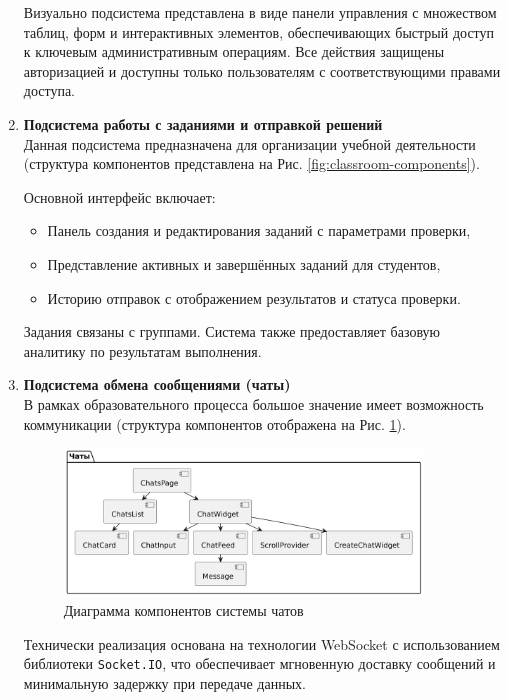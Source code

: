 \begin{enumerate}
  Визуально подсистема представлена в виде панели управления с множеством таблиц, форм и интерактивных элементов, обеспечивающих быстрый доступ к ключевым административным операциям. Все действия защищены авторизацией и доступны только пользователям с соответствующими правами доступа.

  \item \textbf{Подсистема работы с заданиями и отправкой решений}\\
  Данная подсистема предназначена для организации учебной деятельности (структура компонентов представлена на Рис. \ref{fig:classroom-components}). 
  
  Основной интерфейс включает:
  \begin{itemize}
    \item Панель создания и редактирования заданий с параметрами проверки,
    \item Представление активных и завершённых заданий для студентов,
    \item Историю отправок с отображением результатов и статуса проверки.
  \end{itemize}
  
  Задания связаны с группами. Система также предоставляет базовую аналитику по результатам выполнения.

  \item \textbf{Подсистема обмена сообщениями (чаты)}\\ 
  В рамках образовательного процесса большое значение имеет возможность коммуникации (структура компонентов отображена на Рис. \ref{fig:chat-components}).
    
  \begin{figure}[H]
    \centering
    \includegraphics[width=0.9\textwidth]{static/diagrams/ChatsComponentDiagram.png}
    \caption{Диаграмма компонентов системы чатов}
    \label{fig:chat-components}
  \end{figure}
    
  Технически реализация основана на технологии WebSocket с использованием библиотеки \texttt{Socket.IO}, что обеспечивает мгновенную доставку сообщений и минимальную задержку при передаче данных.  
  

\end{enumerate}
